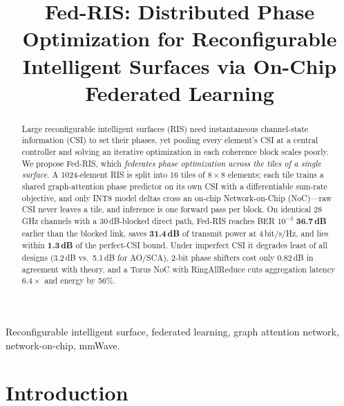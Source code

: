 \documentclass[conference]{IEEEtran}
\newcommand{\fedris}{Fed-RIS\xspace}
\newcommand{\dB}{\,dB\xspace}
\begin{document}
\title{Fed-RIS: Distributed Phase Optimization for Reconfigurable Intelligent Surfaces via On-Chip Federated Learning}

\author{
}

\maketitle

\begin{abstract}
Large reconfigurable intelligent surfaces (RIS) need instantaneous channel-state information (CSI) to set their phases, yet pooling every element's CSI at a central controller and solving an iterative optimization in each coherence block scales poorly. We propose \fedris, which \emph{federates phase optimization across the tiles of a single surface}. A 1024-element RIS is split into 16 tiles of $8\times8$ elements; each tile trains a shared graph-attention phase predictor on its own CSI with a differentiable sum-rate objective, and only INT8 model deltas cross an on-chip Network-on-Chip (NoC)---raw CSI never leaves a tile, and inference is one forward pass per block. On identical 28\,GHz channels with a 30\dB-blocked direct path, \fedris reaches BER $10^{-3}$ \textbf{36.7\dB} earlier than the blocked link, saves \textbf{31.4\dB} of transmit power at 4\,bit/s/Hz, and lies within \textbf{1.3\dB} of the perfect-CSI bound. Under imperfect CSI it degrades least of all designs (3.2\dB vs.\ 5.1\dB for AO/SCA), 2-bit phase shifters cost only 0.82\dB in agreement with theory, and a Torus NoC with RingAllReduce cuts aggregation latency $6.4\times$ and energy by 56\%.
\end{abstract}

\begin{IEEEkeywords}
Reconfigurable intelligent surface, federated learning, graph attention network, network-on-chip, mmWave.
\end{IEEEkeywords}

\section{Introduction}
\end{document}
